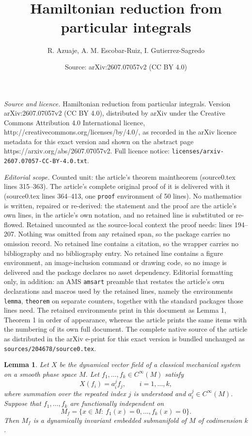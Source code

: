 \documentclass[10pt,a4paper]{amsart}
\title{Hamiltonian reduction from particular integrals}
\author{R. Azuaje, A. M. Escobar-Ruiz, I. Gutierrez-Sagredo}
\date{Source: arXiv:2607.07057v2 (CC BY 4.0)}
\newtheorem{lemma}{Lemma}
\begin{document}
\maketitle

\noindent\emph{Source and licence.} Hamiltonian reduction from particular integrals. Version arXiv:2607.07057v2 (CC BY 4.0), distributed by arXiv under the Creative Commons Attribution 4.0 International licence, http://creativecommons.org/licenses/by/4.0/, as recorded in the arXiv licence metadata for this exact version and shown on the abstract page https://arxiv.org/abs/2607.07057v2. Full licence notice: \texttt{licenses/arxiv-2607.07057-CC-BY-4.0.txt}.\par\smallskip

\noindent\textit{Editorial scope.} Counted unit: the article's theorem maintheorem (source0.tex lines 315--363). The article's complete original proof of it is delivered with it (source0.tex lines 364--413, one \texttt{proof} environment of 50 lines). No mathematics is written, repaired or re-derived: the statement and the proof are the article's own lines, in the article's own notation, and no retained line is substituted or re-flowed.  Retained uncounted as the source-local context the proof needs: lines 194--207.  Nothing was omitted from any retained span, so the package carries no omission record.  No retained line contains a citation, so the wrapper carries no bibliography and no bibliography entry.  No retained line contains a figure environment, an image-inclusion command or drawing code, so no image is delivered and the package declares no asset dependency.  Editorial formatting only, in addition: an AMS \texttt{amsart} preamble that restates the article's own declarations and macros used by the retained lines, namely the environments \texttt{lemma}, \texttt{theorem} on separate counters, together with the standard packages those lines need.  The retained environments print in this document as Lemma 1, Theorem 1 in order of appearance, whereas the article prints the same items with the numbering of its own full document.  The complete native source of the article as distributed in the arXiv e-print for this exact version is bundled unchanged as \texttt{sources/204678/source0.tex}.
\begin{lemma}
\label{lemma1}
Let $X$ be the dynamical vector field of a classical mechanical system on a smooth phase space $M$. Let $f_1,\ldots,f_k\in C^\infty(M)$ satisfy
\begin{equation}
\label{eqPI}
X(f_i)=a_i^j f_j,\qquad i=1,\ldots,k,
\end{equation}
where summation over the repeated index $j$ is understood and $a_i^j\in C^\infty(M)$. Suppose that $f_1,\ldots,f_k$ are functionally independent on
\begin{equation*}
\label{Mf}
M_f=\{x\in M:\ f_1(x)=0,\ldots,f_k(x)=0\}.
\end{equation*}
Then $M_f$ is a dynamically invariant embedded submanifold of $M$ of codimension $k$.
\end{lemma}
\end{document}
